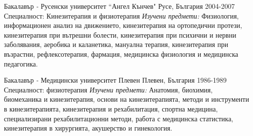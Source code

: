 \cventry
{Бакалавър \textit{-} Русенски университет “Ангел Кънчев"}
{Русе, България  2004-2007}
{
Специалност: Кинезитерапия и физиотерапия
\newline
\textit{Изучени предмети:} Физиология, информационен анализ на движението, кинезитерапия на ортопедични протези, кинезитерапия при вътрешни болести, кинезитерапия при психични и нервни заболявания, аеробика и каланетика, мануална терапия, кинезитерапия при възрастни, рефлексотерапия, фармация, медицинска физиология и медицинска педагогика.
}

\vspace{+3mm}
\cventry
{Бакалавър \textit{-} Медицински университет Плевен}
{Плевен, България 1986-1989}
{
Специалност: физиотерапия
\newline
\textit{Изучени предмети:} Анатомия, биохимия, биомеханика и кинезитерапия, основи на кинезитерапията, методи и инструменти в кинезитерапията, кинезитерапия и рехабилитация, спортна медицина, специализирани рехабилитационни методи, работа с медицинска статистика, кинезитерапия в хирургията, акушерство и гинекология.
}
\vspace{+3mm}